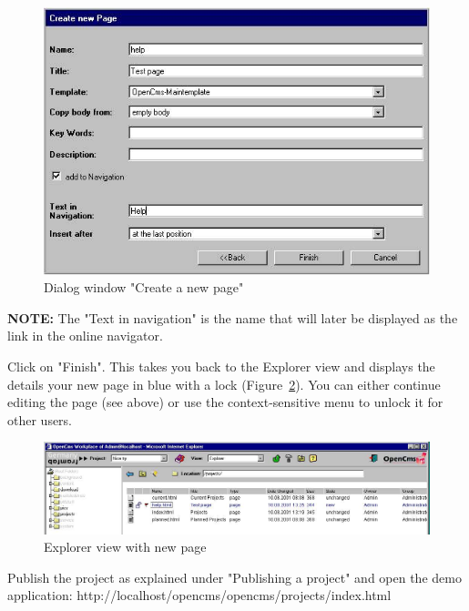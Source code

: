 \begin{figure}[hbt]
\begin{center}
\includegraphics[width=\sgw]
                   {pics/usermanual/newPage02}
\caption[Dialog window "Create a new page"]
           {Dialog window "Create a new page"}
\label{newpage02}
\end{center}
\end{figure}

\textbf{NOTE:} The "Text in navigation" is the name that will
later be displayed as the link in the online navigator.

Click on "Finish". This takes you back to the Explorer view and
displays the details your new page in blue with a lock
(Figure~\ref{explnewpage}). You can either continue editing the
page (see above) or use the context-sensitive menu to unlock it
for other users.

\begin{figure}[hbt]
\begin{center}
\includegraphics[width=\sgw]
                   {pics/usermanual/explNewPage}
\caption[Explorer view with new page]
           {Explorer view with new page}
\label{explnewpage}
\end{center}
\end{figure}

Publish the project as explained under "Publishing a project" and
open the demo application:
http://localhost/opencms/opencms/projects/index.html

